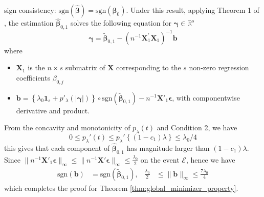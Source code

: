 \documentclass[twoside]{article}
\begin{document}
sign consistency: $\mathrm{sgn}\left(\hat{\boldsymbol{\beta}}\right) = \mathrm{sgn}\left(\boldsymbol{\beta}_0\right)$. Under this result, applying Theorem 1 of \citet{lv2009unified}, the estimation $\hat{\boldsymbol{\beta}}_{0,1}$ solves the following equation for $\boldsymbol{\gamma} \in \mathbb{R}^s$
$$
\boldsymbol{\gamma} = \tilde{\boldsymbol{\beta}}_{0,1}-\left(n^{-1}\mathbf{X}^{\prime}_1\mathbf{X}_1\right)^{-1}\mathbf{b}
$$
where 
\begin{itemize}
    \item $\mathbf{X}_1$ is the $n\times s$ submatrix of $\mathbf{X}$ corresponding to the $s$ non-zero regression coefficients $\beta_{0,j}$
    \item $\mathbf{b} = \left\{ \lambda_0 \mathbf{1}_s +p'_{\lambda}(\lvert \boldsymbol{\gamma} \rvert)  \right\} \circ \mathrm{sgn}(\tilde{\boldsymbol{\beta}}_{0,1})-n^{-1}\mathbf{X}'_1\boldsymbol{\epsilon}$, with componentwise derivative and product.
\end{itemize}
From the concavity and monotonicity of $p_{\lambda}(t)$ and Condition 2, we have 
$$
0 \leq p_{\lambda}'(t)\leq p_{\lambda}'\left\{ (1-c_1)\lambda \right\} \leq \lambda_0/4
$$
this gives that each component of $\hat{\boldsymbol{\beta}}_{0,1}$ has magnitude larger than $(1-c_1)\lambda$. Since $\lVert n^{-1}\mathbf{X}'_1\boldsymbol{\epsilon} \rVert _{\infty} \leq \lVert n^{-1}\mathbf{X}'\boldsymbol{\epsilon} \rVert _{\infty}\leq \frac{\lambda_0}{2}$ on the event $\mathcal{E}$, hence we have
\begin{align*}
    \mathrm{sgn}(\mathbf{b}) &= \mathrm{sgn}(\tilde{\boldsymbol{\beta}}_{0,1}), & \frac{\lambda_0}{2}&\leq \lVert \mathbf{b}\rVert _{\infty}\leq \frac{7\lambda_0}{4}
\end{align*}
which completes the proof for Theorem \ref{thm:global_minimizer_property}.
\end{document}
